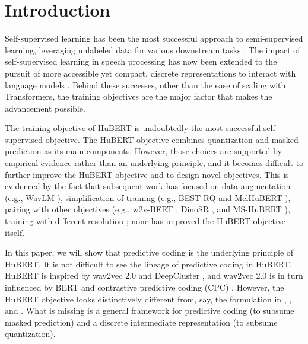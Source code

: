 \documentclass[11pt,a4paper]{article}
\begin{document}
\section{Introduction}

Self-supervised learning has been the most successful approach to semi-supervised learning, leveraging unlabeled data for various downstream tasks \citep{zhang2022bigssl}.
The impact of self-supervised learning in speech processing has now been extended to the pursuit of more accessible yet compact, discrete representations to interact with language models \citep{lakhotia2021generative,borsos2023audiolm,wang2023neural}.
Behind these successes, other than the ease of scaling with Transformers, the training objectives are the major factor that makes the advancement possible.

The training objective of HuBERT \citep{hsu2021hubert} is undoubtedly the most successful self-supervised objective.
The HuBERT objective combines quantization and masked prediction as its main components.
However, those choices are supported by empirical evidence rather than an underlying principle, and it becomes difficult to further improve the HuBERT objective and to design novel objectives.
This is evidenced by the fact that subsequent work has focused on data augmentation (e.g., WavLM \citep{chen2022wavlm}), simplification of training (e.g., BEST-RQ \citep{chiu2022self} and MelHuBERT \citep{lin2022melhubert}), 
pairing with other objectives (e.g., w2v-BERT \citep{chung2021w2v}, DinoSR \citep{liu2024dinosr}, 
and MS-HuBERT \citep{yadav2024ms}), 
training with different resolution \citep{shi2023multi}; none has improved the HuBERT objective itself.

In this paper, we will show that predictive coding is the underlying principle of HuBERT.
It is not difficult to see the lineage of predictive coding in HuBERT.
HuBERT is inspired by wav2vec 2.0 \citep{baevski2020wav2vec} and DeepCluster \citep{caron2018deep}, 
and wav2vec 2.0 is in turn influenced by BERT \citep{devlin2018bert} and contrastive predictive coding (CPC) \citep{oord2018representation}.
However, the HuBERT objective looks distinctively different from, say, the formulation in \citet{atal1971speech}, \citet{srinivasan1982predictive}, and \citet{rao1999predictive}.
What is missing is a general framework for predictive coding (to subsume masked prediction) and a discrete intermediate representation (to subsume quantization).
\end{document}
